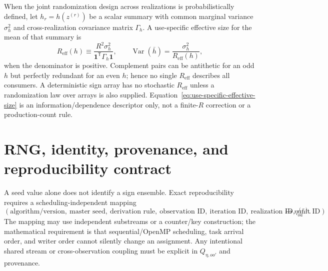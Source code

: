 \documentclass[11pt]{article}
\newcommand{\Var}{\operatorname{Var}}
\newcommand{\one}{\bm{1}}
\begin{document}
When the joint randomization design across realizations is probabilistically
defined, let $h_r=h(z^{(r)})$ be a scalar summary with common marginal variance
$\sigma_h^2$ and cross-realization covariance matrix $\Gamma_h$.  A
use-specific effective size for the mean of that summary is
\begin{equation}
  R_{\mathrm{eff}}(h)
  \equiv
  \frac{R^2\sigma_h^2}{\one^{\mathsf T}\Gamma_h\one},
  \qquad
  \Var(\bar h)=\frac{\sigma_h^2}{R_{\mathrm{eff}}(h)},
  \label{eq:use-specific-effective-size}
\end{equation}
when the denominator is positive.  Complement pairs can be antithetic for an
odd $h$ but perfectly redundant for an even $h$; hence no single
$R_{\mathrm{eff}}$ describes all consumers.  A deterministic sign array has
no stochastic $R_{\mathrm{eff}}$ unless a randomization law over arrays is
also supplied.  Equation~\eqref{eq:use-specific-effective-size} is an
information/dependence descriptor only, not a finite-$R$ correction or a
production-count rule.

\section{RNG, identity, provenance, and reproducibility contract}

A seed value alone does not identify a sign ensemble.  Exact reproducibility
requires a scheduling-independent mapping
\begin{equation}
  (\text{algorithm/version},\ \text{master seed},\ \text{derivation rule},
  \ \text{observation ID},\ \text{iteration ID},\ \text{realization ID},
  \ \text{unit ID})
  \longmapsto\eta_{oa}^{(r)}.
  \label{eq:rng-key-map}
\end{equation}
The mapping may use independent substreams or a counter/key construction; the
mathematical requirement is that sequential/OpenMP scheduling, task arrival
order, and writer order cannot silently change an assignment.  Any intentional
shared stream or cross-observation coupling must be explicit in
$Q_{\eta,oo'}$ and provenance.
\end{document}
